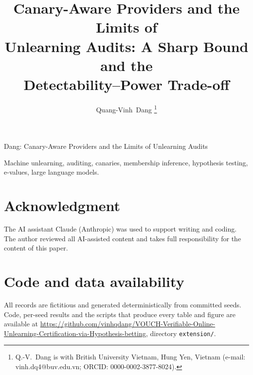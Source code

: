 \documentclass[journal]{IEEEtran}
\theoremstyle{definition}
\theoremstyle{remark}
\begin{document}
\title{Canary-Aware Providers and the Limits of\\ Unlearning Audits: A Sharp Bound and the\\
Detectability--Power Trade-off}

\author{Quang-Vinh~Dang%
\thanks{Q.-V.~Dang is with British University Vietnam, Hung Yen, Vietnam
(e-mail: vinh.dq4@buv.edu.vn; ORCID: 0000-0002-3877-8024).}}

%
{Dang: Canary-Aware Providers and the Limits of Unlearning Audits}

\maketitle

\begin{abstract}

\end{abstract}

\begin{IEEEkeywords}
Machine unlearning, auditing, canaries, membership inference, hypothesis testing,
e-values, large language models.
\end{IEEEkeywords}









\section*{Acknowledgment}
The AI assistant Claude (Anthropic) was used to support writing and coding. The author reviewed all
AI-assisted content and takes full responsibility for the content of this paper.

\section*{Code and data availability}
All records are fictitious and generated deterministically from committed seeds. Code,
per-seed results and the scripts that produce every table and figure are available at
\url{https://github.com/vinhqdang/VOUCH-Verifiable-Online-Unlearning-Certification-via-Hypothesis-betting},
directory \texttt{extension/}.



\end{document}
